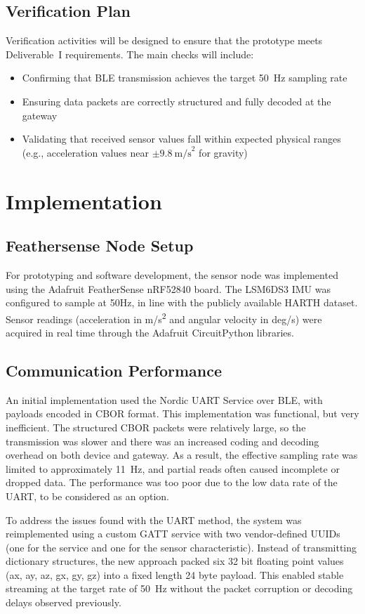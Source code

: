 \documentclass[conference]{IEEEtran}
\begin{document}
\subsection{Verification Plan}
Verification activities will be designed to ensure that the prototype meets Deliverable~I requirements. The main checks will include:
\begin{itemize}
	\item Confirming that BLE transmission achieves the target 50~Hz sampling rate
	\item Ensuring data packets are correctly structured and fully decoded at the gateway
	\item Validating that received sensor values fall within expected physical ranges (e.g., acceleration values near $\pm 9.8~\text{m/s}^2$ for gravity)
\end{itemize}

\section{Implementation}
\subsection{Feathersense Node Setup}
For prototyping and software development, the sensor node was implemented using the Adafruit FeatherSense nRF52840 board. The LSM6DS3 IMU was configured to sample at 50Hz, in line with the publicly available HARTH dataset. Sensor readings (acceleration in m/s\textsuperscript{2} and angular velocity in deg/s) were acquired in real time through the Adafruit CircuitPython libraries. 

\subsection{Communication Performance}
An initial implementation used the Nordic UART Service over BLE, with payloads encoded in CBOR format. This implementation was functional, but very inefficient. The structured CBOR packets were relatively large, so the transmission was slower and there was an increased coding and decoding overhead on both device and gateway. As a result, the effective sampling rate was limited to approximately 11~Hz, and partial reads often caused incomplete or dropped data. The performance was too poor due to the low data rate of the UART, to be considered as an option.

To address the issues found with the UART method, the system was reimplemented using a custom GATT service with two vendor-defined UUIDs (one for the service and one for the sensor characteristic). Instead of transmitting dictionary structures, the new approach packed six 32 bit floating point values (ax, ay, az, gx, gy, gz) into a fixed length 24 byte payload. This enabled stable streaming at the target rate of 50~Hz without the packet corruption or decoding delays observed previously.
\end{document}
